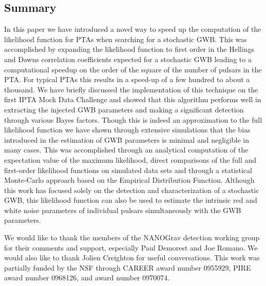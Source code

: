 \documentclass[iop]{emulateapj}
\begin{document}
\subsection{Summary}

In this paper we have introduced a novel way to speed up the computation of the likelihood function for PTAs when searching for a stochastic GWB. This was accomplished by expanding the likelihood function to first order in the Hellings and Downs correlation coefficients expected for a stochastic GWB leading to a computational speedup on the order of the square of the number of pulsars in the PTA. For typical PTAs this results in a speed-up of a few hundred to about a thousand. We have briefly discussed the implementation of this technique on the first IPTA Mock Data Challenge and showed that this algorithm performs well in extracting the injected GWB parameters and making a significant detection through various Bayes factors. Though this is indeed an approximation to the full likelihood function we have shown through extensive simulations that the bias introduced in the estimation of GWB parameters is minimal and negligible in many cases. This was accomplished through an analytical computation of the expectation value of the maximum likelihood, direct comparisons of the full and first-order likelihood functions on simulated data sets and through a statistical Monte-Carlo approach based on the Empirical Distribution Function. Although this work has focused solely on the detection and characterization of a stochastic GWB, this likelihood function can also be used to estimate the intrinsic red and white noise parameters of individual pulsars simultaneously with the GWB parameters. 

\acknowledgements
We would like to thank the members of the NANOGrav detection working group for their comments and support, especially Paul Demorest and Joe Romano. We would also like to thank Jolien Creighton for useful conversations. This work was partially funded by the NSF through CAREER award number 0955929, PIRE award number 0968126, and award number 0970074.

\appendix
\end{document}
